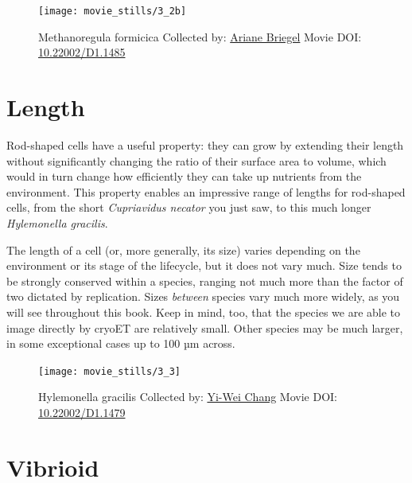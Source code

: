 \documentclass[]{tufte-book}
\begin{document}
\begin{figure}
\texttt{[image: movie\_stills/3\_2b]} \caption[Methanoregula formicica Collected by:
\protect\hyperlink{ariane_briegel}{Ariane Briegel} Movie DOI:
\href{https://doi.org/10.22002/D1.1485}{10.22002/D1.1485}]{Methanoregula formicica Collected by:
\protect\hyperlink{ariane_briegel}{Ariane Briegel} Movie DOI:
\href{https://doi.org/10.22002/D1.1485}{10.22002/D1.1485}}\label{fig:3-2b}
\end{figure}

\section{Length}\label{length}

Rod-shaped cells have a useful property: they can grow by extending
their length without significantly changing the ratio of their surface
area to volume, which would in turn change how efficiently they can take
up nutrients from the environment. This property enables an impressive
range of lengths for rod-shaped cells, from the short \emph{Cupriavidus
necator} you just saw, to this much longer \emph{Hylemonella gracilis}.

The length of a cell (or, more generally, its size) varies depending on
the environment or its stage of the lifecycle, but it does not vary
much. Size tends to be strongly conserved within a species, ranging not
much more than the factor of two dictated by replication. Sizes
\emph{between} species vary much more widely, as you will see throughout
this book. Keep in mind, too, that the species we are able to image
directly by cryoET are relatively small. Other species may be much
larger, in some exceptional cases up to 100 µm across.





\begin{figure}
\texttt{[image: movie\_stills/3\_3]} \caption[Hylemonella gracilis Collected by:
\protect\hyperlink{yi-wei_chang}{Yi-Wei Chang} Movie DOI:
\href{https://doi.org/10.22002/D1.1479}{10.22002/D1.1479}]{Hylemonella gracilis Collected by:
\protect\hyperlink{yi-wei_chang}{Yi-Wei Chang} Movie DOI:
\href{https://doi.org/10.22002/D1.1479}{10.22002/D1.1479}}\label{fig:3-3}
\end{figure}

\section{Vibrioid}\label{vibrioid}
\end{document}
